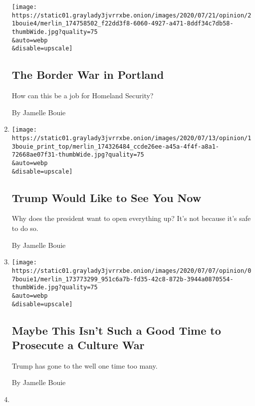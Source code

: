 \begin{enumerate}
  \texttt{[image: https://static01.graylady3jvrrxbe.onion/images/2020/07/21/opinion/21bouie4/merlin\_174758502\_f22dd3f8-6060-4927-a471-8ddf34c7db58-thumbWide.jpg?quality=75\\\&auto=webp\\\&disable=upscale]}

  \hypertarget{the-border-war-in-portland}{%
  \subsection{The Border War in
  Portland}\label{the-border-war-in-portland}}

  How can this be a job for Homeland Security?

  By Jamelle Bouie
\item
  \href{/2020/07/10/opinion/trump-schools-reopening.html}{}

  \texttt{[image: https://static01.graylady3jvrrxbe.onion/images/2020/07/13/opinion/13bouie\_print\_top/merlin\_174326484\_ccde26ee-a45a-4f4f-a8a1-72668ae07f31-thumbWide.jpg?quality=75\\\&auto=webp\\\&disable=upscale]}

  \hypertarget{trump-would-like-to-see-you-now}{%
  \subsection{Trump Would Like to See You
  Now}\label{trump-would-like-to-see-you-now}}

  Why does the president want to open everything up? It's not because
  it's safe to do so.

  By Jamelle Bouie
\item
  \href{/2020/07/07/opinion/trump-mount-rushmore-culture-war.html}{}

  \texttt{[image: https://static01.graylady3jvrrxbe.onion/images/2020/07/07/opinion/07bouie1/merlin\_173773299\_951c6a7b-fd35-42c8-872b-3944a0870554-thumbWide.jpg?quality=75\\\&auto=webp\\\&disable=upscale]}

  \hypertarget{maybe-this-isnt-such-a-good-time-to-prosecute-a-culture-war}{%
  \subsection{Maybe This Isn't Such a Good Time to Prosecute a Culture
  War}\label{maybe-this-isnt-such-a-good-time-to-prosecute-a-culture-war}}

  Trump has gone to the well one time too many.

  By Jamelle Bouie
\item
  \href{/2020/06/26/opinion/black-lives-matter-injustice.html}{}


\end{enumerate}
